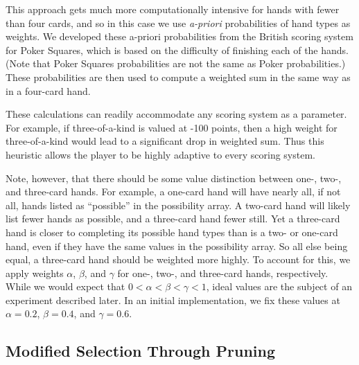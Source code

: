 \documentclass[letterpaper]{article}
\begin{document}
This approach gets much more computationally intensive for hands with fewer than four cards, and so in this case we use {\it a-priori} probabilities of hand types as weights. We developed these a-priori probabilities from the British scoring system for Poker Squares, which is based on the difficulty of finishing each of the hands. (Note that Poker Squares probabilities are not the same as Poker probabilities.) These probabilities are then used to compute a weighted sum in the same way as in a four-card hand.

These calculations can readily accommodate any scoring system as a parameter. For example, if three-of-a-kind is valued at -100 points, then a high weight for three-of-a-kind would lead to a significant drop in weighted sum. Thus this heuristic allows the player to be highly adaptive to every scoring system.

Note, however, that there should be some value distinction between one-, two-, and three-card hands. For example, a one-card hand will have nearly all, if not all, hands listed as ``possible'' in the possibility array. A two-card hand will likely list fewer hands as possible, and a three-card hand fewer still. Yet a three-card hand is closer to completing its possible hand types than is a two- or one-card hand, even if they have the same values in the possibility array. So all else being equal, a three-card hand should be weighted more highly. To account for this, we apply weights $\alpha$, $\beta$, and $\gamma$ for one-, two-, and three-card hands, respectively. While we would expect that $0 < \alpha < \beta < \gamma < 1$, ideal values are the subject of an experiment described later. In an initial implementation, we fix these values at $\alpha = 0.2$, $\beta = 0.4$, and $\gamma = 0.6$.


\subsection{Modified Selection Through Pruning}
\end{document}
